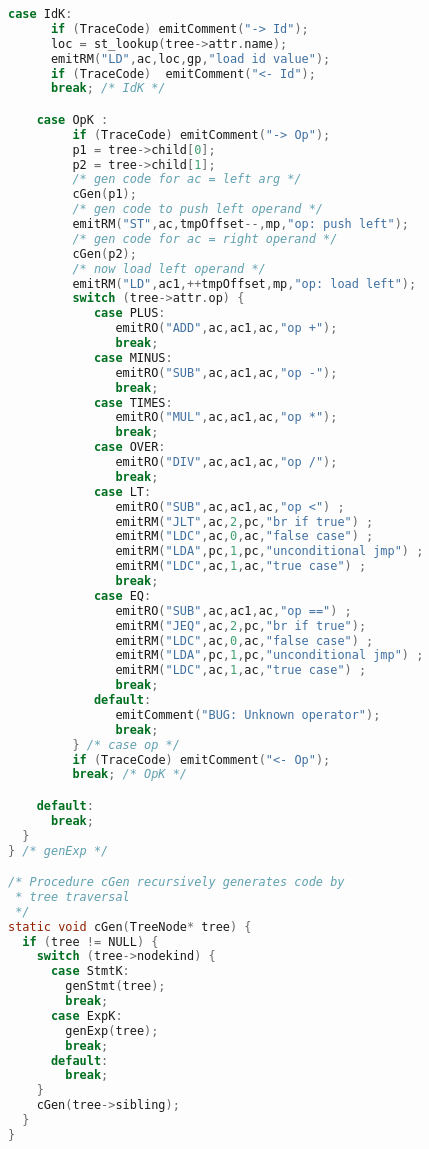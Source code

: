 \documentclass[lang=cn,10pt]{elegantbook}
\begin{document}
\begin{lstlisting}[caption={cgen.c},language=c]
    case IdK:
      if (TraceCode) emitComment("-> Id");
      loc = st_lookup(tree->attr.name);
      emitRM("LD",ac,loc,gp,"load id value");
      if (TraceCode)  emitComment("<- Id");
      break; /* IdK */

    case OpK :
         if (TraceCode) emitComment("-> Op");
         p1 = tree->child[0];
         p2 = tree->child[1];
         /* gen code for ac = left arg */
         cGen(p1);
         /* gen code to push left operand */
         emitRM("ST",ac,tmpOffset--,mp,"op: push left");
         /* gen code for ac = right operand */
         cGen(p2);
         /* now load left operand */
         emitRM("LD",ac1,++tmpOffset,mp,"op: load left");
         switch (tree->attr.op) {
            case PLUS:
               emitRO("ADD",ac,ac1,ac,"op +");
               break;
            case MINUS:
               emitRO("SUB",ac,ac1,ac,"op -");
               break;
            case TIMES:
               emitRO("MUL",ac,ac1,ac,"op *");
               break;
            case OVER:
               emitRO("DIV",ac,ac1,ac,"op /");
               break;
            case LT:
               emitRO("SUB",ac,ac1,ac,"op <") ;
               emitRM("JLT",ac,2,pc,"br if true") ;
               emitRM("LDC",ac,0,ac,"false case") ;
               emitRM("LDA",pc,1,pc,"unconditional jmp") ;
               emitRM("LDC",ac,1,ac,"true case") ;
               break;
            case EQ:
               emitRO("SUB",ac,ac1,ac,"op ==") ;
               emitRM("JEQ",ac,2,pc,"br if true");
               emitRM("LDC",ac,0,ac,"false case") ;
               emitRM("LDA",pc,1,pc,"unconditional jmp") ;
               emitRM("LDC",ac,1,ac,"true case") ;
               break;
            default:
               emitComment("BUG: Unknown operator");
               break;
         } /* case op */
         if (TraceCode) emitComment("<- Op");
         break; /* OpK */

    default:
      break;
  }
} /* genExp */

/* Procedure cGen recursively generates code by
 * tree traversal
 */
static void cGen(TreeNode* tree) {
  if (tree != NULL) {
    switch (tree->nodekind) {
      case StmtK:
        genStmt(tree);
        break;
      case ExpK:
        genExp(tree);
        break;
      default:
        break;
    }
    cGen(tree->sibling);
  }
}


\end{lstlisting}
\end{document}
